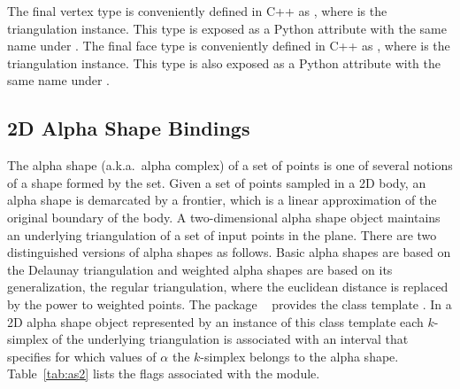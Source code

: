 The final vertex type is conveniently defined in C++ as
, where  is the
triangulation instance. This type is exposed as a Python attribute
with the same name under .
%
The final face type is conveniently defined in C++ as
, where  is the triangulation
instance. This type is also exposed as a Python attribute with the
same name under .

\subsection{2D Alpha Shape Bindings}
\label{ssec:modules:as2}
The alpha shape (a.k.a.\ alpha complex) of a set of points is one of
several notions of a shape formed by the set. Given a set of points
sampled in a 2D body, an alpha shape is demarcated by a frontier,
which is a linear approximation of the original boundary of the
body. A two-dimensional alpha shape object maintains an underlying
triangulation of a set of input points in the plane. There are two
distinguished versions of alpha shapes as follows. Basic alpha shapes
are based on the Delaunay triangulation and weighted alpha shapes are
based on its generalization, the regular triangulation, where the
euclidean distance is replaced by the power to weighted points.  The
package \iiDAlphaShapesPackage{}~\cite{cgal:d-as2-21a} provides the
class template . In a 2D alpha shape object represented by
an instance of this class template each $k$-simplex of the underlying
triangulation is associated with an interval that specifies for which
values of $\alpha$ the $k$-simplex belongs to the alpha shape.
Table~\ref{tab:as2} lists the \cmake{} flags associated with the
\iiDAlphaShapesPackage{} module.

\begin{table}[!htp]
  \caption{\iiDAlphaShapesPackage{} module flags}
  \centering{}
 \label{tab:as2}
\end{table}

